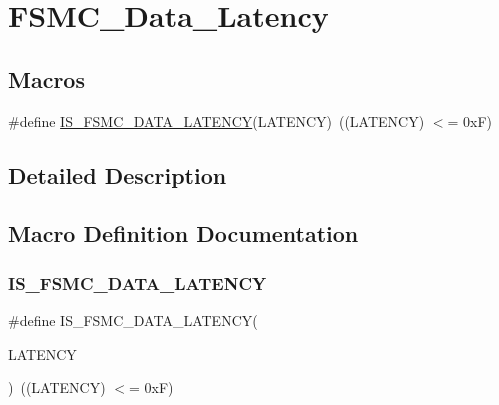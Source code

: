 \hypertarget{group___f_s_m_c___data___latency}{}\section{F\+S\+M\+C\+\_\+\+Data\+\_\+\+Latency}
\label{group___f_s_m_c___data___latency}
\subsection*{Macros}
\begin{DoxyCompactItemize}
\item 
\#define \mbox{\hyperlink{group___f_s_m_c___data___latency_ga1ab8659a9631d8bb4f57d8be8580155c}{I\+S\+\_\+\+F\+S\+M\+C\+\_\+\+D\+A\+T\+A\+\_\+\+L\+A\+T\+E\+N\+CY}}(L\+A\+T\+E\+N\+CY)~((L\+A\+T\+E\+N\+CY) $<$= 0x\+F)
\end{DoxyCompactItemize}


\subsection{Detailed Description}


\subsection{Macro Definition Documentation}
\mbox{\label{group___f_s_m_c___data___latency_ga1ab8659a9631d8bb4f57d8be8580155c}} 
\subsubsection{\texorpdfstring{IS\_FSMC\_DATA\_LATENCY}{IS\_FSMC\_DATA\_LATENCY}}
{\footnotesize\ttfamily \#define I\+S\+\_\+\+F\+S\+M\+C\+\_\+\+D\+A\+T\+A\+\_\+\+L\+A\+T\+E\+N\+CY(\begin{DoxyParamCaption}\item[{}]{L\+A\+T\+E\+N\+CY }\end{DoxyParamCaption})~((L\+A\+T\+E\+N\+CY) $<$= 0x\+F)}


